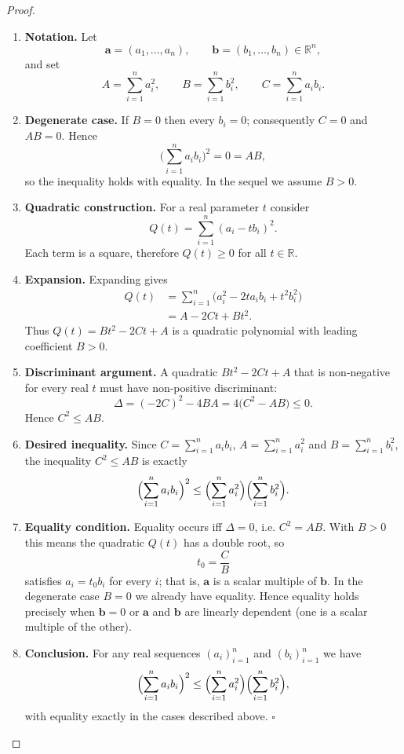 \begin{proof}
\begin{enumerate}
\item \textbf{Notation.}  
Let
\[
\mathbf a=(a_{1},\dots ,a_{n}),\qquad 
\mathbf b=(b_{1},\dots ,b_{n})\in\mathbb R^{n},
\]
and set
\[
A=\sum_{i=1}^{n}a_{i}^{2},\qquad 
B=\sum_{i=1}^{n}b_{i}^{2},\qquad 
C=\sum_{i=1}^{n}a_{i}b_{i}.
\]

\item \textbf{Degenerate case.}  
If \(B=0\) then every \(b_{i}=0\); consequently \(C=0\) and \(AB=0\). Hence
\[
\bigl(\sum_{i=1}^{n}a_{i}b_{i}\bigr)^{2}=0=AB,
\]
so the inequality holds with equality. In the sequel we assume \(B>0\).

\item \textbf{Quadratic construction.}  
For a real parameter \(t\) consider
\[
Q(t)=\sum_{i=1}^{n}(a_{i}-t b_{i})^{2}.
\]
Each term is a square, therefore \(Q(t)\ge 0\) for all \(t\in\mathbb R\).

\item \textbf{Expansion.}  
Expanding gives
\begin{align*}
Q(t) &=\sum_{i=1}^{n}\bigl(a_{i}^{2}-2t a_{i}b_{i}+t^{2}b_{i}^{2}\bigr)\\
     &=A-2Ct+Bt^{2}.
\end{align*}
Thus \(Q(t)=Bt^{2}-2Ct+A\) is a quadratic polynomial with leading coefficient \(B>0\).

\item \textbf{Discriminant argument.}  
A quadratic \(Bt^{2}-2Ct+A\) that is non‑negative for every real \(t\) must have non‑positive discriminant:
\[
\Delta =(-2C)^{2}-4BA =4\bigl(C^{2}-AB\bigr)\le 0.
\]
Hence \(C^{2}\le AB\).

\item \textbf{Desired inequality.}  
Since \(C=\sum_{i=1}^{n}a_{i}b_{i}\), \(A=\sum_{i=1}^{n}a_{i}^{2}\) and \(B=\sum_{i=1}^{n}b_{i}^{2}\), the inequality \(C^{2}\le AB\) is exactly
\[
\Bigl(\sum_{i=1}^{n}a_{i}b_{i}\Bigr)^{2}\le
\Bigl(\sum_{i=1}^{n}a_{i}^{2}\Bigr)
\Bigl(\sum_{i=1}^{n}b_{i}^{2}\Bigr).
\]

\item \textbf{Equality condition.}  
Equality occurs iff \(\Delta =0\), i.e. \(C^{2}=AB\). With \(B>0\) this means the quadratic \(Q(t)\) has a double root, so
\[
t_{0}= \frac{C}{B}
\]
satisfies \(a_{i}=t_{0}b_{i}\) for every \(i\); that is, \(\mathbf a\) is a scalar multiple of \(\mathbf b\).  
In the degenerate case \(B=0\) we already have equality. Hence equality holds precisely when \(\mathbf b=0\) or \(\mathbf a\) and \(\mathbf b\) are linearly dependent (one is a scalar multiple of the other).

\item \textbf{Conclusion.}  
For any real sequences \((a_{i})_{i=1}^{n}\) and \((b_{i})_{i=1}^{n}\) we have
\[
\Bigl(\sum_{i=1}^{n}a_{i}b_{i}\Bigr)^{2}\le
\Bigl(\sum_{i=1}^{n}a_{i}^{2}\Bigr)
\Bigl(\sum_{i=1}^{n}b_{i}^{2}\Bigr),
\]
with equality exactly in the cases described above. \(\square\)
\end{enumerate}
\end{proof}